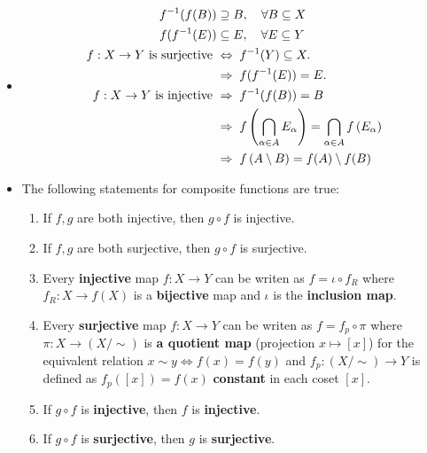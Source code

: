 \documentclass[11pt]{article}
\begin{document}
\begin{itemize}
\item \begin{remark}
\begin{align*}
f^{-1}(f(B)) &\supseteq  B,\quad \forall B \subseteq X \\
f(f^{-1}(E)) &\subseteq E,\quad \forall E \subseteq Y \\
f: X\rightarrow Y \text{ is surjective }&\Leftrightarrow \; f^{-1}(Y) \subseteq X. \\
&\Rightarrow  \; f(f^{-1}(E)) = E. \\
f: X\rightarrow Y \text{ is injective }& \Rightarrow\; f^{-1}(f(B)) = B \\
& \Rightarrow\; f\left(\bigcap_{\alpha \in A}E_{\alpha}\right) = \bigcap_{\alpha \in A}f\left(E_{\alpha}\right) \\
& \Rightarrow\; f\left(A \setminus B\right) = f(A) \setminus f(B)
\end{align*}
\end{remark}

\item \begin{proposition}
The following statements for composite functions are true:
\begin{enumerate}
\item If $f, g$ are both injective, then $g \circ f$ is injective. 
\item If $f, g$ are both surjective, then $g \circ f$ is surjective. 
\item Every \textbf{injective} map $f: X \rightarrow Y$ can be writen as $f = \iota \circ f_{R}$ where $f_R: X \rightarrow f(X)$ is a \textbf{bijective} map and $\iota$ is the \textbf{inclusion map}.
\item Every \textbf{surjective} map $f: X \rightarrow Y$ can be writen as $f =  f_{p} \circ \pi$ where $\pi: X\rightarrow (X/\sim)$ is \textbf{a quotient map} (projection $x \mapsto [x]$) for the equivalent relation $ x \sim y \Leftrightarrow f(x) = f(y)$ and  $f_p: (X/\sim) \rightarrow Y$ is defined as $f_p([x]) = f(x)$ \textbf{constant} in each coset $[x]$.
\item If $g \circ f$ is \textbf{injective}, then $f$ is \textbf{injective}.
\item If $g \circ f$ is \textbf{surjective}, then $g$ is \textbf{surjective}.
\end{enumerate}
\end{proposition}
\end{itemize}
\end{document}
